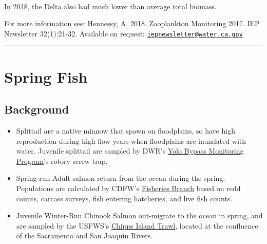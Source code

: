 \documentclass[
]{book}
\providecommand{\tightlist}{%
  \setlength{\itemsep}{0pt}\setlength{\parskip}{0pt}}
\begin{document}
\begin{panel-grid}
\begin{columns-nocenter}
\begin{column40}

~

\end{column40}

\begin{column800}

In 2018, the Delta also had much lower than average total biomass.

\end{column800}

\end{columns-nocenter}

\end{panel-grid}

\begin{disclaimer}
For more information see: Hennessy, A. 2018. Zooplankton Monitoring
2017. IEP Newsletter 32(1):21-32. Available on request:
\href{mailto:iepnewsletter@water.ca.gov}{\nolinkurl{iepnewsletter@water.ca.gov}}
\end{disclaimer}

\begin{center}\rule{0.5\linewidth}{0.5pt}\end{center}

\hypertarget{spring-fish}{%
\section{Spring Fish}\label{spring-fish}}

\hypertarget{background-4}{%
\subsection{Background}\label{background-4}}

\begin{itemize}
\tightlist
\item
  Splittail are a native minnow that spawn on floodplains, so have high reproduction during high flow years when floodplains are inundated with water. Juvenile splittail are sampled by DWR's \href{https://portal.edirepository.org/nis/mapbrowse?packageid=edi.233.2}{Yolo Bypass Monitoring Program}'s rotory screw trap.
\item
  Spring-run Adult salmon return from the ocean during the spring. Populations are calculated by CDFW's \href{http://www.cbr.washington.edu/sacramento/data/query_adult_grandtab.html}{Fisheries Branch} based on redd counts, carcass surveys, fish entering hatcheries, and live fish counts.
\item
  Juvenile Winter-Run Chinook Salmon out-migrate to the ocean in spring, and are sampled by the USFWS's \href{https://www.fws.gov/lodi/juvenile_fish_monitoring_program/jfmp_index.htm}{Chipps Island Trawl}, located at the confluence of the Sacramento and San Joaquin Rivers.
\end{itemize}
\end{document}
